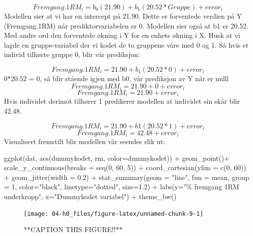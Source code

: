 \documentclass[
]{book}
\newenvironment{Shaded}{\begin{snugshade}}{\end{snugshade}}
\newcommand{\AttributeTok}[1]{\textcolor[rgb]{0.77,0.63,0.00}{#1}}
\newcommand{\DecValTok}[1]{\textcolor[rgb]{0.00,0.00,0.81}{#1}}
\newcommand{\FloatTok}[1]{\textcolor[rgb]{0.00,0.00,0.81}{#1}}
\newcommand{\FunctionTok}[1]{\textcolor[rgb]{0.00,0.00,0.00}{#1}}
\newcommand{\NormalTok}[1]{#1}
\newcommand{\SpecialCharTok}[1]{\textcolor[rgb]{0.00,0.00,0.00}{#1}}
\newcommand{\StringTok}[1]{\textcolor[rgb]{0.31,0.60,0.02}{#1}}
\begin{document}
\[
Fremgang.1RM_i = b_0(21.90) + b_1(20.52*Gruppe) + error_i
\]
Modellen sier at vi har en intercept på 21.90. Dette er forventede verdien på Y (Fremgang.1RM) når prediktorvariabelen er 0. Modellen sier også at b1 er 20.52. Med andre ord den forventede økning i Y for en enhets økning i X. Husk at vi lagde en gruppe-variabel der vi kodet de to gruppene våre med 0 og 1. Så hvis et individ tilhørte gruppe 0, blir vår prediksjon:

\[
Fremgang.1RM_i = 21.90 + b_1(20.52*0) + error_i
\]
0*20.52 = 0, så blir stående igjen med b0, vår prediksjon av Y når er nulll
\[
Fremgang.1RM_i = 21.90 + 0 + error_i
\]
\[
Fremgang.1RM_i = 21.90 + error_i
\]
Hvis individet derimot tilhører 1 predikerer modellen at individet sin skår blir 42.48.

\[
Fremgang.1RM_i = 21.90 + b1(20.52*1) + error_i
\]
\[
Fremgang.1RM_i = 42.48 + error_i
\]
Visualisert fremstilt blir modellen vår seendes slik ut:

\begin{Shaded}
\begin{Highlighting}[]
\FunctionTok{ggplot}\NormalTok{(dat, }\FunctionTok{aes}\NormalTok{(dummykodet, rm, }\AttributeTok{color=}\NormalTok{dummykodet)) }\SpecialCharTok{+}
  \FunctionTok{geom\_point}\NormalTok{()}\SpecialCharTok{+}
  \FunctionTok{scale\_y\_continuous}\NormalTok{(}\AttributeTok{breaks =} \FunctionTok{seq}\NormalTok{(}\DecValTok{0}\NormalTok{, }\DecValTok{60}\NormalTok{, }\DecValTok{5}\NormalTok{)) }\SpecialCharTok{+}
  \FunctionTok{coord\_cartesian}\NormalTok{(}\AttributeTok{ylim =} \FunctionTok{c}\NormalTok{(}\DecValTok{0}\NormalTok{, }\DecValTok{60}\NormalTok{)) }\SpecialCharTok{+}
  \FunctionTok{geom\_jitter}\NormalTok{(}\AttributeTok{width =} \FloatTok{0.2}\NormalTok{) }\SpecialCharTok{+} 
  \FunctionTok{stat\_summary}\NormalTok{(}\AttributeTok{geom =} \StringTok{"line"}\NormalTok{, }\AttributeTok{fun =}\NormalTok{ mean, }\AttributeTok{group =} \DecValTok{1}\NormalTok{, }\AttributeTok{color=}\StringTok{"black"}\NormalTok{, }\AttributeTok{linetype=}\StringTok{"dotted"}\NormalTok{, }\AttributeTok{size=}\FloatTok{1.2}\NormalTok{) }\SpecialCharTok{+}
  \FunctionTok{labs}\NormalTok{(}\AttributeTok{y=}\StringTok{"\% fremgang 1RM underkropp"}\NormalTok{, }\AttributeTok{x=}\StringTok{"Dummykodet variabel"}\NormalTok{) }\SpecialCharTok{+}
  \FunctionTok{theme\_bw}\NormalTok{()}
\end{Highlighting}
\end{Shaded}

\begin{figure}

{\centering \texttt{[image: 04-h0\_files/figure-latex/unnamed-chunk-9-1]} 

}

\caption{**CAPTION THIS FIGURE!!**}\label{fig:unnamed-chunk-9}
\end{figure}
\end{document}
